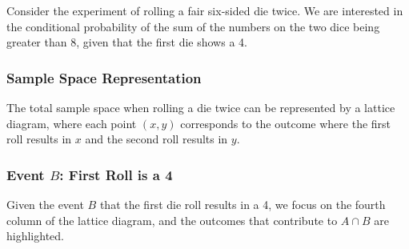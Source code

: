 \begin{example}
Consider the experiment of rolling a fair six-sided die twice. We are interested in the conditional probability of the sum of the numbers on the two dice being greater than 8, given that the first die shows a 4.

\subsubsection*{Sample Space Representation}
The total sample space when rolling a die twice can be represented by a lattice diagram, where each point \((x,y)\) corresponds to the outcome where the first roll results in \(x\) and the second roll results in \(y\).

\begin{center}
\end{center}

\subsubsection*{Event \(B\): First Roll is a 4}
Given the event \(B\) that the first die roll results in a 4, we focus on the fourth column of the lattice diagram, and the outcomes that contribute to \(A \cap B\) are highlighted.

\begin{center}
\end{center}
\end{example}

